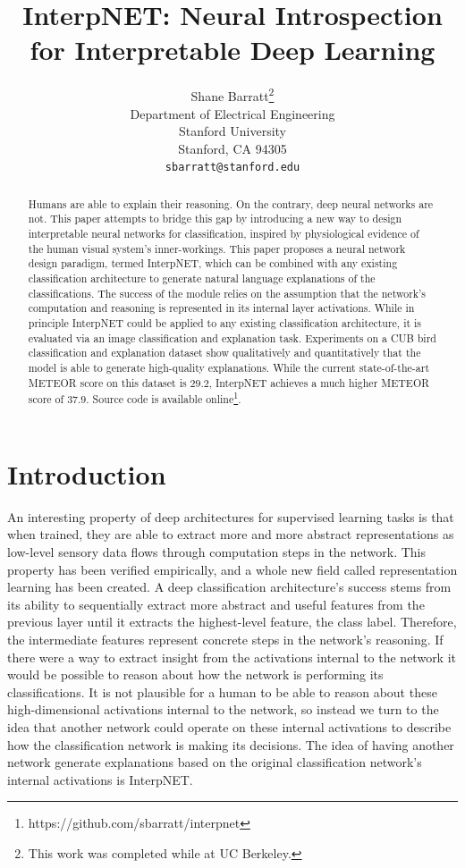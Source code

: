 \documentclass{article}
\title{InterpNET: Neural Introspection for Interpretable Deep Learning}
\author{
  Shane Barratt\thanks{This work was completed while at UC Berkeley.} \\
  Department of Electrical Engineering\\
  Stanford University \\
  Stanford, CA 94305 \\
  \texttt{sbarratt@stanford.edu} \\
}
\begin{document}

\maketitle

\begin{abstract}
Humans are able to explain their reasoning. On the contrary, deep neural networks are not. This paper attempts to bridge this gap by introducing a new way to design interpretable neural networks for classification, inspired by physiological evidence of the human visual system's inner-workings. This paper proposes a neural network design paradigm, termed InterpNET, which can be combined with any existing classification architecture to generate natural language explanations of the classifications. The success of the module relies on the assumption that the network's computation and reasoning is represented in its internal layer activations. While in principle InterpNET could be applied to any existing classification architecture, it is evaluated via an image classification and explanation task. Experiments on a CUB bird classification and explanation dataset show qualitatively and quantitatively that the model is able to generate high-quality explanations. While the current state-of-the-art METEOR score on this dataset is $29.2$, InterpNET achieves a much higher METEOR score of $37.9$. Source code is available online\footnote{https://github.com/sbarratt/interpnet}.
\end{abstract}

\section{Introduction}
An interesting property of deep architectures for supervised learning tasks is that when trained, they are able to extract more and more abstract representations as low-level sensory data flows through computation steps in the network. This property has been verified empirically, and a whole new field called representation learning has been created. A deep classification architecture's success stems from its ability to sequentially extract more abstract and useful features from the previous layer until it extracts the highest-level feature, the class label. Therefore, the intermediate features represent concrete steps in the network's reasoning. If there were a way to extract insight from the activations internal to the network it would be possible to reason about how the network is performing its classifications. It is not plausible for a human to be able to reason about these high-dimensional activations internal to the network, so instead we turn to the idea that another network could operate on these internal activations to describe how the classification network is making its decisions. The idea of having another network generate explanations based on the original classification network's internal activations is InterpNET.
\end{document}
